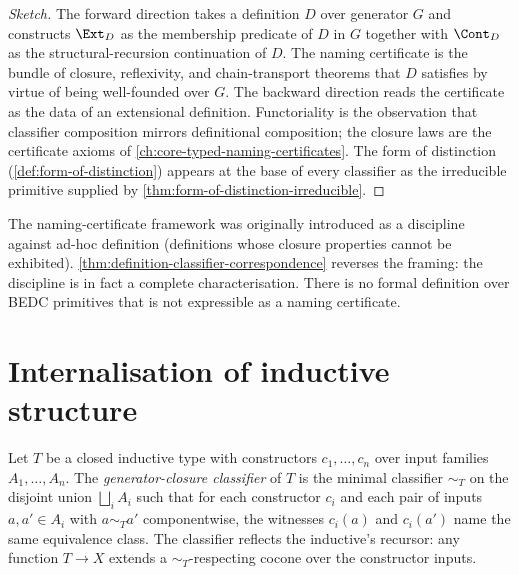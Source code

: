 \begin{proof}[Sketch]
The forward direction takes a definition $D$ over generator $G$ and constructs $\Ext_D$ as the membership predicate of $D$ in $G$ together with $\Cont_D$ as the structural-recursion continuation of $D$. The naming certificate is the bundle of closure, reflexivity, and chain-transport theorems that $D$ satisfies by virtue of being well-founded over $G$. The backward direction reads the certificate as the data of an extensional definition. Functoriality is the observation that classifier composition mirrors definitional composition; the closure laws are the certificate axioms of \autoref{ch:core-typed-naming-certificates}. The form of distinction (\autoref{def:form-of-distinction}) appears at the base of every classifier as the irreducible primitive supplied by \autoref{thm:form-of-distinction-irreducible}.
\end{proof}

\begin{remark}
The naming-certificate framework was originally introduced as a discipline against ad-hoc definition (definitions whose closure properties cannot be exhibited). \autoref{thm:definition-classifier-correspondence} reverses the framing: the discipline is in fact a complete characterisation. There is no formal definition over BEDC primitives that is not expressible as a naming certificate.
\end{remark}

\section{Internalisation of inductive structure}
\label{sec:reflection-inductive-internalisation}

\begin{definition}
\label{def:generator-closure-classifier}
Let $T$ be a closed inductive type with constructors $c_1, \dots, c_n$ over input families $A_1, \dots, A_n$. The \emph{generator-closure classifier} of $T$ is the minimal classifier $\sim_T$ on the disjoint union $\bigsqcup_i A_i$ such that for each constructor $c_i$ and each pair of inputs $a, a' \in A_i$ with $a \sim_T a'$ componentwise, the witnesses $c_i(a)$ and $c_i(a')$ name the same equivalence class. The classifier reflects the inductive's recursor: any function $T \to X$ extends a $\sim_T$-respecting cocone over the constructor inputs.
\end{definition}

